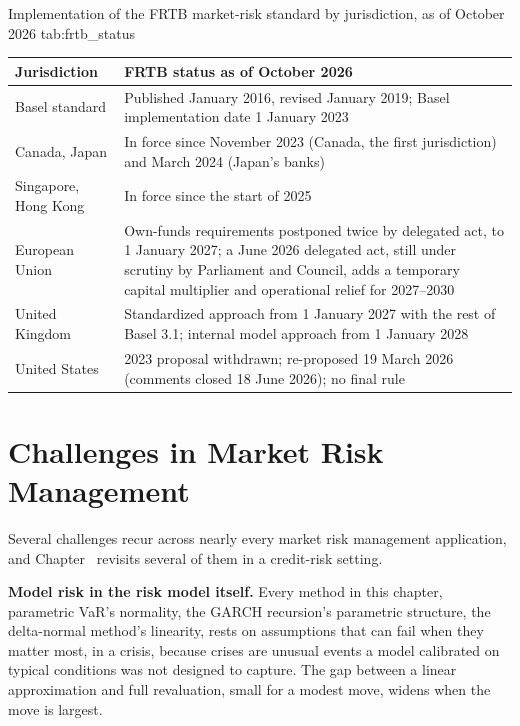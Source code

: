 \documentclass[../ai_in_finance]{subfiles}
\begin{document}
\begin{booktable}{Implementation of the FRTB market-risk standard by jurisdiction, as of October 2026 \parencite{bcbs2020deferral,ec2025marketrisk,ec2026marketrisk,pra2026ps126,fed2026capital}}{tab:frtb_status}
\begin{tabular}{L{2.9cm}L{9.3cm}}
\toprule
Jurisdiction & FRTB status as of October 2026 \\
\midrule
Basel standard & Published January 2016, revised January 2019; Basel implementation date 1 January 2023 \\
Canada, Japan & In force since November 2023 (Canada, the first jurisdiction) and March 2024 (Japan's banks) \\
Singapore, Hong Kong & In force since the start of 2025 \\
European Union & Own-funds requirements postponed twice by delegated act, to 1 January 2027; a June 2026 delegated act, still under scrutiny by Parliament and Council, adds a temporary capital multiplier and operational relief for 2027--2030 \\
United Kingdom & Standardized approach from 1 January 2027 with the rest of Basel 3.1; internal model approach from 1 January 2028 \\
United States & 2023 proposal withdrawn; re-proposed 19 March 2026 (comments closed 18 June 2026); no final rule \\
\bottomrule
\end{tabular}
\end{booktable}

\section{Challenges in Market Risk Management}

Several challenges recur across nearly every market risk management application, and Chapter~ revisits several of them in a credit-risk setting.

\textbf{Model risk in the risk model itself.} Every method in this chapter, parametric VaR's normality, the GARCH recursion's parametric structure, the delta-normal method's linearity, rests on assumptions that can fail when they matter most, in a crisis, because crises are unusual events a model calibrated on typical conditions was not designed to capture.
The gap between a linear approximation and full revaluation, small for a modest move, widens when the move is largest.
\end{document}
